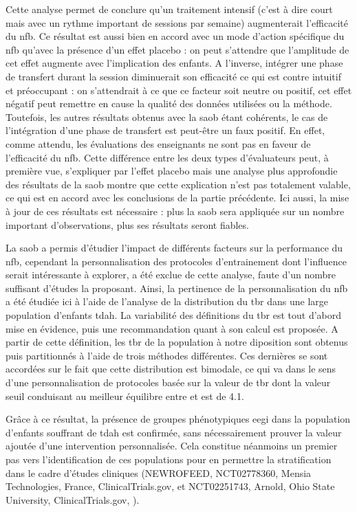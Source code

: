 Cette analyse permet de conclure qu'un traitement intensif (c'est à dire court mais avec un rythme important de sessions par semaine) augmenterait 
l'efficacité du \gls{nfb}. Ce résultat est aussi bien en accord avec un mode d'action spécifique du \gls{nfb} qu'avec la présence d'un effet placebo :
on peut s'attendre que l'amplitude de cet effet augmente avec l'implication des enfants. A l'inverse,  
intégrer une phase de transfert durant la session diminuerait son efficacité ce qui est contre intuitif et préoccupant : on s'attendrait à ce que ce facteur 
soit neutre ou positif, cet effet négatif peut remettre en cause la qualité des données utilisées ou la méthode. Toutefois, les autres résultats obtenus 
avec la \gls{saob} étant cohérents, le cas de l'intégration d'une phase de transfert est peut-être un faux positif. En effet, comme attendu, les évaluations des enseignants ne sont pas en faveur de l'efficacité du \gls{nfb}. 
Cette différence entre les deux types d'évaluateurs peut, à première vue, s'expliquer par l'effet placebo mais une analyse plus approfondie des 
résultats de la \gls{saob} montre que cette explication n'est pas totalement valable, ce qui est en accord avec les conclusions de la partie précédente. 
Ici aussi, la mise à jour de ces résultats est nécessaire : plus la \gls{saob} sera appliquée sur un nombre important d'observations,
plus ses résultats seront fiables.

La \gls{saob} a permis d'étudier l'impact de différents facteurs sur la performance du \gls{nfb}, cependant la personnalisation 
des protocoles d'entrainement dont l'influence serait intéressante 
à explorer, a été exclue de cette analyse, faute d'un nombre suffisant d'études la proposant. Ainsi, la pertinence de la personnalisation 
du \gls{nfb} a été étudiée ici à l'aide de l'analyse de la distribution 
du \gls{tbr} dans une large population d'enfants \gls{tdah}. La variabilité des définitions du \gls{tbr} est tout d'abord mise en 
évidence, puis une recommandation quant à son calcul est proposée. A partir de cette définition, les \gls{tbr} de la population à notre diposition
sont obtenus puis partitionnés à l'aide de trois méthodes différentes. Ces dernières se sont accordées sur le fait que cette distribution 
est bimodale, ce qui va dans 
le sens d'une personnalisation de protocoles basée sur la valeur de \gls{tbr} dont la valeur seuil conduisant au meilleur équilibre entre 
 et  est de 4.1. 

Grâce à ce résultat, la présence de 
groupes phénotypiques \gls{eegi} dans la population d'enfants souffrant de \gls{tdah} est confirmée, sans nécessairement prouver la valeur ajoutée d'une 
intervention personnalisée. Cela constitue néanmoins un premier pas vers l'identification de ces populations pour en 
permettre la stratification dans le cadre d'études cliniques (NEWROFEED, NCT02778360, Mensia Technologies, France, ClinicalTrials.gov, \citet{Bioulac2019} et NCT02251743, Arnold, Ohio State University, 
ClinicalTrials.gov, \citet{Kerson2013}).

